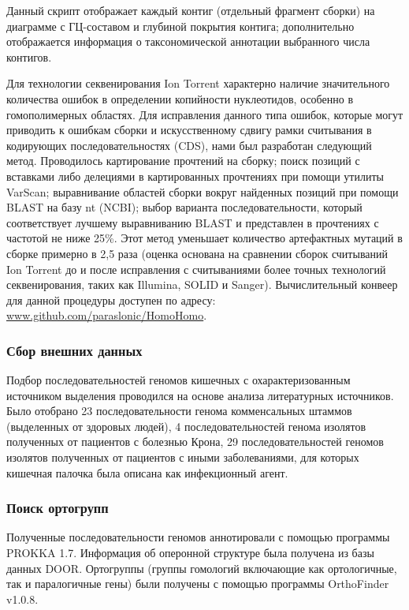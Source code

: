 Данный скрипт отображает каждый контиг (отдельный фрагмент сборки) на диаграмме с ГЦ-составом и глубиной покрытия контига; дополнительно отображается информация о таксономической аннотации выбранного числа контигов. 

Для технологии секвенирования Ion Torrent характерно наличие значительного количества ошибок в определении копийности нуклеотидов, особенно в гомополимерных областях. Для исправления данного типа ошибок, которые могут приводить к ошибкам сборки и искусственному сдвигу рамки считывания в кодирующих последовательностях (CDS), нами был разработан следующий метод. Проводилось картирование прочтений на сборку; поиск позиций с вставками либо делециями в картированных прочтениях при помощи утилиты VarScan; выравнивание областей сборки вокруг найденных позиций при помощи BLAST на базу nt (NCBI); выбор варианта последовательности, который соответствует лучшему выравниванию BLAST и представлен в прочтениях с частотой не ниже 25\%. Этот метод уменьшает количество артефактных мутаций в сборке примерно в 2,5 раза (оценка основана на сравнении сборок считываний Ion Torrent до и после исправления с считываниями более точных технологий секвенирования, таких как Illumina, SOLID и Sanger). Вычислительный конвеер для данной процедуры доступен по адресу: \url{www.github.com/paraslonic/HomoHomo}.


\subsubsection{Сбор внешних данных}
Подбор последовательностей геномов кишечных с охарактеризованным источником выделения проводился на основе анализа литературных источников. Было отобрано 23 последовательности генома комменсальных штаммов (выделенных от здоровых людей), 4 последовательностей генома изолятов полученных от пациентов с болезнью Крона, 29 последовательностей геномов изолятов полученных от пациентов с иными заболеваниями, для которых кишечная палочка была описана как инфекционный агент.

\subsubsection{Поиск ортогрупп}
Полученные последовательности геномов аннотировали с помощью программы PROKKA 1.7. Информация об оперонной структуре была получена из базы данных DOOR. Ортогруппы (группы гомологий включающие как ортологичные, так и паралогичные гены) были получены с помощью программы OrthoFinder v1.0.8. 

